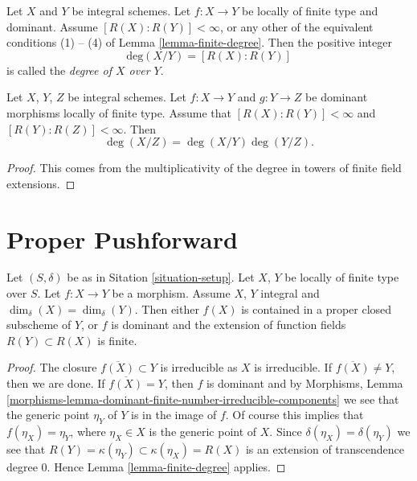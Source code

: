 \begin{definition}
\label{definition-degree}
Let $X$ and $Y$ be integral schemes.
Let $f : X \to Y$ be locally of finite type and dominant.
Assume $[R(X) : R(Y)] < \infty$, or any other of the equivalent
conditions (1) -- (4) of Lemma \ref{lemma-finite-degree}.
Then the positive integer
$$
\text{deg}(X/Y) = [R(X) : R(Y)]
$$
is called the {\it degree of $X$ over $Y$}.
\end{definition}

\begin{lemma}
\label{lemma-degree-composition}
Let $X$, $Y$, $Z$ be integral schemes.
Let $f : X \to Y$ and $g : Y \to Z$ be dominant morphisms locally
of finite type. Assume that $[R(X) : R(Y)] < \infty$ and
$[R(Y) : R(Z)] < \infty$. Then
$$
\deg(X/Z) = \deg(X/Y) \deg(Y/Z).
$$
\end{lemma}

\begin{proof}
This comes from the multiplicativity of the degree in towers
of finite field extensions.
\end{proof}




\section{Proper Pushforward}
\label{section-pushforward}

\begin{lemma}
\label{lemma-equal-dimension}
Let $(S, \delta)$ be as in Sitation \ref{situation-setup}.
Let $X$, $Y$ be locally of finite type over $S$.
Let $f : X \to Y$ be a morphism.
Assume $X$, $Y$ integral and $\dim_\delta(X) = \dim_\delta(Y)$.
Then either $f(X)$ is contained in a proper closed subscheme
of $Y$, or $f$ is dominant and the extension of function fields
$R(Y) \subset R(X)$ is finite.
\end{lemma}

\begin{proof}
The closure $\overline{f(X)} \subset Y$ is irreducible as $X$
is irreducible. If $\overline{f(X)} \not = Y$, then we are done.
If $\overline{f(X)} = Y$, then $f$ is dominant and by
Morphisms,
Lemma \ref{morphisms-lemma-dominant-finite-number-irreducible-components}
we see that the generic point $\eta_Y$ of $Y$ is in the image of $f$.
Of course this implies that $f(\eta_X) = \eta_Y$, where $\eta_X \in X$
is the generic point of $X$. Since $\delta(\eta_X) = \delta(\eta_Y)$
we see that $R(Y) = \kappa(\eta_Y) \subset \kappa(\eta_X) = R(X)$
is an extension of transcendence degree $0$.
Hence Lemma \ref{lemma-finite-degree} applies.
\end{proof}

